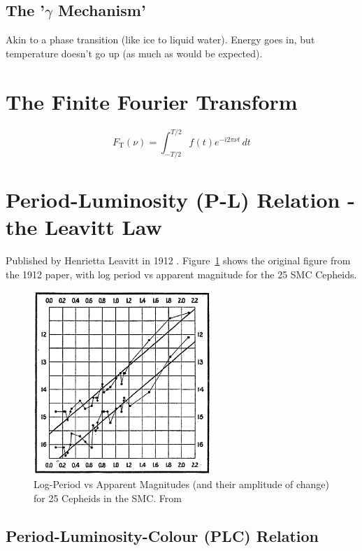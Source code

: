 \documentclass{spy}
\begin{document}
\subsection{The '\(\gamma\) Mechanism'}
Akin to a phase transition (like ice to liquid water). Energy goes in, but temperature doesn't go up (as much as would be expected). 

\section{The Finite Fourier Transform}
\begin{equation}
F_\mathrm{T}(\nu) = \int_{-T/2}^{T/2} f(t)e^{-i 2\pi \nu t} \,dt
\end{equation}

\section{Period-Luminosity (P-L) Relation - the Leavitt Law}

Published by Henrietta Leavitt in 1912 \citep{leavittPeriods25Variable1912}. Figure~\ref{leavitt_period_luminosity_diagram} shows the original figure from the 1912 paper, with log period vs apparent magnitude for the 25 SMC Cepheids.

\begin{figure}[ht]
    \centering
    \includegraphics[width=0.6\textwidth]{leavitt_period_luminosity.eps}
    \caption{Log-Period vs Apparent Magnitudes (and their amplitude of change) for 25 Cepheids in the SMC. From \citet{leavittPeriods25Variable1912}}    \label{leavitt_period_luminosity_diagram}
\end{figure}

\subsection{Period-Luminosity-Colour (PLC) Relation}
\end{document}
